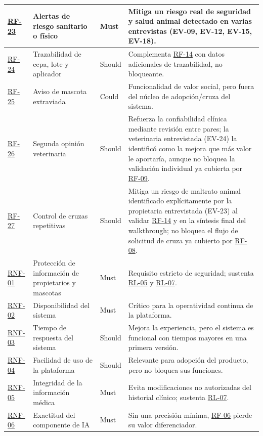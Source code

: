 \documentclass[journal,onecolumn]{IEEEtran}
\begin{document}
\begin{longtable}{@{}p{1.6cm} p{4.8cm} p{1.6cm} p{5.2cm}@{}}
		\hline
		\hyperref[tab:RF-23]{RF-23} & Alertas de riesgo sanitario o físico & Must & Mitiga un riesgo real de seguridad y salud animal detectado en varias entrevistas (EV-09, EV-12, EV-15, EV-18). \\
		\hline
		\hyperref[tab:RF-24]{RF-24} & Trazabilidad de cepa, lote y aplicador & Should & Complementa \hyperref[tab:RF-14]{RF-14} con datos adicionales de trazabilidad, no bloqueante. \\
		\hline
		\hyperref[tab:RF-25]{RF-25} & Aviso de mascota extraviada & Could & Funcionalidad de valor social, pero fuera del núcleo de adopción/cruza del sistema. \\
		\hline
		\hyperref[tab:RF-26]{RF-26} & Segunda opinión veterinaria & Should & Refuerza la confiabilidad clínica mediante revisión entre pares; la veterinaria entrevistada (EV-24) la identificó como la mejora que más valor le aportaría, aunque no bloquea la validación individual ya cubierta por \hyperref[tab:RF-09]{RF-09}. \\
		\hline
		\hyperref[tab:RF-27]{RF-27} & Control de cruzas repetitivas & Should & Mitiga un riesgo de maltrato animal identificado explícitamente por la propietaria entrevistada (EV-23) al validar \hyperref[tab:RF-14]{RF-14} y en la síntesis final del walkthrough; no bloquea el flujo de solicitud de cruza ya cubierto por \hyperref[tab:RF-08]{RF-08}. \\
		\hline
		\hyperref[tab:RNF-01]{RNF-01} & Protección de información de propietarios y mascotas & Must & Requisito estricto de seguridad; sustenta \hyperref[rl:05]{RL-05} y \hyperref[rl:07]{RL-07}. \\
		\hline
		\hyperref[tab:RNF-02]{RNF-02} & Disponibilidad del sistema & Must & Crítico para la operatividad continua de la plataforma. \\
		\hline
		\hyperref[tab:RNF-03]{RNF-03} & Tiempo de respuesta del sistema & Should & Mejora la experiencia, pero el sistema es funcional con tiempos mayores en una primera versión. \\
		\hline
		\hyperref[tab:RNF-04]{RNF-04} & Facilidad de uso de la plataforma & Should & Relevante para adopción del producto, pero no bloquea sus funciones. \\
		\hline
		\hyperref[tab:RNF-05]{RNF-05} & Integridad de la información médica & Must & Evita modificaciones no autorizadas del historial clínico; sustenta \hyperref[rl:07]{RL-07}. \\
		\hline
		\hyperref[tab:RNF-06]{RNF-06} & Exactitud del componente de IA & Must & Sin una precisión mínima, \hyperref[tab:RF-06]{RF-06} pierde su valor diferenciador. \\

\end{longtable}
\end{document}
